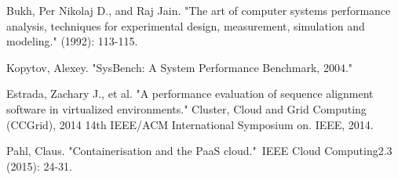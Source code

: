 \documentclass[11pt]{article}
\begin{document}
\begin{thebibliography}{99}
		Bukh, Per Nikolaj D., and Raj Jain. "The art of computer systems performance analysis, techniques for experimental design, measurement, simulation and modeling." (1992): 113-115.
		
		Kopytov, Alexey. "SysBench: A System Performance Benchmark, 2004."
		
		Estrada, Zachary J., et al. "A performance evaluation of sequence alignment software in virtualized environments." Cluster, Cloud and Grid Computing (CCGrid), 2014 14th IEEE/ACM International Symposium on. IEEE, 2014.
		
		Pahl, Claus. "Containerisation and the PaaS cloud." IEEE Cloud Computing2.3 (2015): 24-31.
		
	\end{thebibliography}
	
\end{document}
